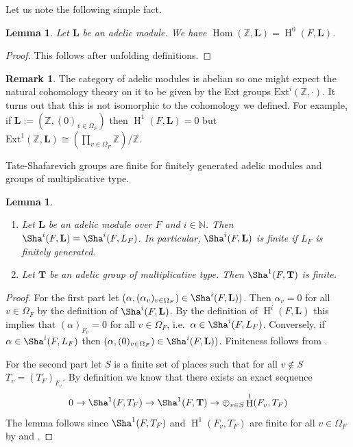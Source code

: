 \documentclass[a4paper,11pt,reqno]{amsart}
\newcommand{\N}{\mathbb{N}}\newcommand{\Z}{\mathbb{Z}}
\DeclareMathOperator{\Hom}{Hom}
\DeclareMathOperator{\HH}{H}
\newtheorem{lemma}[theorem]{Lemma}
\theoremstyle{definition}
\newtheorem{remark}[theorem]{Remark}
\begin{document}
Let us note the following simple fact.
\begin{lemma}
	Let $\mathbf{L}$ be an adelic module. We have $\Hom(\Z, \mathbf{L}) = \HH^0(F, \mathbf{L})$.
	\label{Computation of the global characters of an adelic multiplicative group}
\end{lemma}
\begin{proof}
	This follows after unfolding definitions.
\end{proof}
\begin{remark}
	The category of adelic modules is abelian so one might expect the natural cohomology theory on it to be given by the Ext groups $\text{Ext}^i(\Z, \cdot)$. It turns out that this is not isomorphic to the cohomology we defined. For example, if $\mathbf{L} := (\Z, (0)_{v \in \Omega_F})$ then $\HH^1(F, \mathbf{L}) = 0$ but $\text{Ext}^1(\Z, \mathbf{L}) \cong (\prod_{v \in \Omega_F} \Z) /\Z$. 
	\label{Comparison between adelic H and adelic Ext}
\end{remark}

Tate-Shafarevich groups are finite for finitely generated adelic modules and groups of multiplicative type.
\begin{lemma}
	\hfill
	\begin{enumerate} 
		\item Let $\mathbf{L}$ be an adelic module over $F$ and $i \in \N$. Then $\Sha^i(F, \mathbf{L}) = \Sha^i(F, L_F)$. In particular, $\Sha^i(F, \mathbf{L})$ is finite if $L_F$ is finitely generated.
		
		\item Let $\mathbf{T}$ be an adelic group of multiplicative type. Then $\Sha^1(F, \mathbf{T})$ is finite.
	\end{enumerate}
\end{lemma}
\begin{proof}
	For the first part let $(\alpha, (\alpha_v)_{v \in \Omega_F}) \in \Sha^i(F, \mathbf{L}))$. Then $\alpha_v = 0$ for all $v \in \Omega_F$ by the definition of $\Sha^i(F, \mathbf{L})$. By the definition of $\HH^i(F, \mathbf{L})$ this implies that $(\alpha)_{F_v} = 0$ for all $v \in \Omega_F$, i.e.~$\alpha \in \Sha^i(F, L_F)$. Conversely, if $\alpha \in \Sha^i(F, L_F)$ then $(\alpha, (0)_{v \in \Omega_F}) \in \Sha^i(F, \mathbf{L}))$. Finiteness follows from \cite[Thm.~4.20]{Milne2006Duality}.
	
	For the second part let $S$ is a finite set of places such that for all $v \not \in S$ $T_v = (T_F)_{F_v}$. By definition we know that there exists an exact sequence
	\begin{equation*}
		0 \to \Sha^1(F, T_F) \to \Sha^1(F, \mathbf{T}) \to \oplus_{v \in S} \HH^1(F_v, T_F)
		\end{equation*}
	The lemma follows since $\Sha^1(F, T_F)$ and $\HH^1(F_v, T_F)$ are finite for all $v \in \Omega_F$ by \cite[Thm.~8.6.7]{Neukirch2008Cohomology} and \cite[Cor.~2.3]{Milne2006Duality}.
\end{proof}
\end{document}
